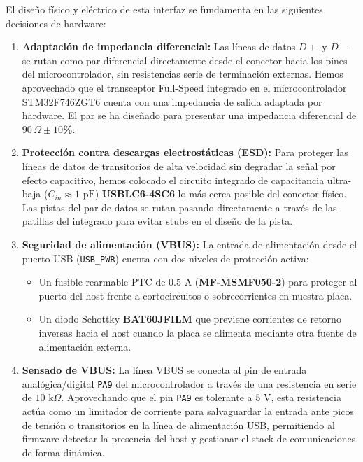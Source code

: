 \documentclass[12pt,a4paper]{article}
\begin{document}
El diseño físico y eléctrico de esta interfaz se fundamenta en las siguientes decisiones de hardware:
\begin{enumerate}
    \item \textbf{Adaptación de impedancia diferencial:} Las líneas de datos $D+$ y $D-$ se rutan como par diferencial directamente desde el conector hacia los pines del microcontrolador, sin resistencias serie de terminación externas. Hemos aprovechado que el transceptor Full-Speed integrado en el microcontrolador STM32F746ZGT6 cuenta con una impedancia de salida adaptada por hardware. El par se ha diseñado para presentar una impedancia diferencial de \textbf{$90\,\Omega \pm 10$\%}.
    \item \textbf{Protección contra descargas electrostáticas (ESD):} Para proteger las líneas de datos de transitorios de alta velocidad sin degradar la señal por efecto capacitivo, hemos colocado el circuito integrado de capacitancia ultra-baja ($C_{in} \approx 1\text{ pF}$) \textbf{USBLC6-4SC6} lo más cerca posible del conector físico. Las pistas del par de datos se rutan pasando directamente a través de las patillas del integrado para evitar stubs en el diseño de la pista.
    \item \textbf{Seguridad de alimentación (VBUS):} La entrada de alimentación desde el puerto USB (\texttt{USB\_PWR}) cuenta con dos niveles de protección activa:
        \begin{itemize}
            \item Un fusible rearmable PTC de $0.5\text{ A}$ (\textbf{MF-MSMF050-2}) para proteger al puerto del host frente a cortocircuitos o sobrecorrientes en nuestra placa.
            \item Un diodo Schottky \textbf{BAT60JFILM} que previene corrientes de retorno inversas hacia el host cuando la placa se alimenta mediante otra fuente de alimentación externa.
        \end{itemize}
    \item \textbf{Sensado de VBUS:} La línea VBUS se conecta al pin de entrada analógica/digital \texttt{PA9} del microcontrolador a través de una resistencia en serie de $10\text{ k}\Omega$. Aprovechando que el pin \texttt{PA9} es tolerante a $5\text{ V}$, esta resistencia actúa como un limitador de corriente para salvaguardar la entrada ante picos de tensión o transitorios en la línea de alimentación USB, permitiendo al firmware detectar la presencia del host y gestionar el stack de comunicaciones de forma dinámica.
\end{enumerate}
\end{document}
